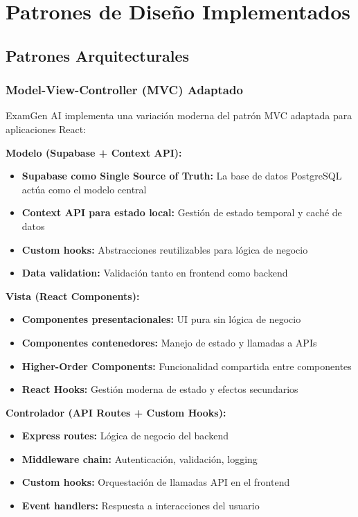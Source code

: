 \documentclass[12pt,a4paper]{report}
\begin{document}
\section{Patrones de Diseño Implementados}

\subsection{Patrones Arquitecturales}

\subsubsection{Model-View-Controller (MVC) Adaptado}

ExamGen AI implementa una variación moderna del patrón MVC adaptada para aplicaciones React:

\textbf{Modelo (Supabase + Context API):}
\begin{itemize}
\item \textbf{Supabase como Single Source of Truth:} La base de datos PostgreSQL actúa como el modelo central
\item \textbf{Context API para estado local:} Gestión de estado temporal y caché de datos
\item \textbf{Custom hooks:} Abstracciones reutilizables para lógica de negocio
\item \textbf{Data validation:} Validación tanto en frontend como backend
\end{itemize}

\textbf{Vista (React Components):}
\begin{itemize}
\item \textbf{Componentes presentacionales:} UI pura sin lógica de negocio
\item \textbf{Componentes contenedores:} Manejo de estado y llamadas a APIs
\item \textbf{Higher-Order Components:} Funcionalidad compartida entre componentes
\item \textbf{React Hooks:} Gestión moderna de estado y efectos secundarios
\end{itemize}

\textbf{Controlador (API Routes + Custom Hooks):}
\begin{itemize}
\item \textbf{Express routes:} Lógica de negocio del backend
\item \textbf{Middleware chain:} Autenticación, validación, logging
\item \textbf{Custom hooks:} Orquestación de llamadas API en el frontend
\item \textbf{Event handlers:} Respuesta a interacciones del usuario
\end{itemize}
\end{document}
